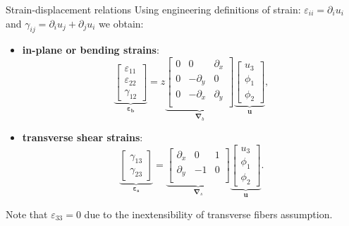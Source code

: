 \documentclass[aspectratio=169]{beamer}
\begin{document}
\begin{frame}{Strain-displacement relations}
  Using engineering definitions of strain: $\varepsilon_{ii}=\partial_i u_i$ and $\gamma_{ij}=\partial_i u_j+\partial_j u_i$ we obtain:
  \begin{itemize}
    \item \textbf{in-plane or bending strains}:
          $$\underbrace{\begin{bmatrix}
                \varepsilon_{11} \\ \varepsilon_{22} \\ \gamma_{12}
              \end{bmatrix}}_\text{$\boldsymbol{\varepsilon_b}$} = z \underbrace{\begin{bmatrix}
                0 & 0           & \partial_x \\
                0 & -\partial_y & 0          \\
                0 & -\partial_x & \partial_y \\
              \end{bmatrix}}_\text{$\boldsymbol\nabla_{b}$} \underbrace{\begin{bmatrix}
                u_3 \\ \phi_1 \\ \phi_2
              \end{bmatrix}}_\text{$\mathbf{u}$},$$
    \item \textbf{transverse shear strains}:
          $$\underbrace{\begin{bmatrix}
                \gamma_{13} \\ \gamma_{23}
              \end{bmatrix}}_\text{$\boldsymbol{\varepsilon_s}$} = \underbrace{\begin{bmatrix}
                \partial_x & 0  & 1 \\
                \partial_y & -1 & 0 \\
              \end{bmatrix}}_\text{$\boldsymbol\nabla_{s}$} \underbrace{\begin{bmatrix}
                u_3 \\ \phi_1 \\ \phi_2
              \end{bmatrix}}_\text{$\mathbf{u}$}.$$
  \end{itemize}
  Note that $\varepsilon_{33}=0$ due to the inextensibility of transverse fibers assumption.
\end{frame}
\end{document}
